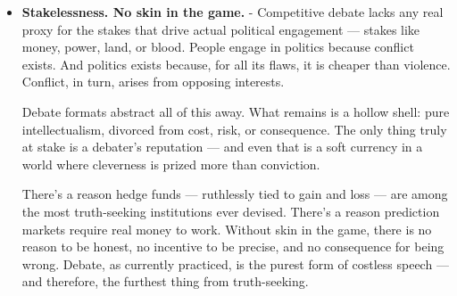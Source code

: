 \begin{itemize}
    Because adjudicators self-replicate through mentorship, feedback, and appointment to “breaking” panels, the ideological DNA of early community leaders becomes canon law. These norms propagate not via formal enforcement but prestige incentives (e.g. who gets to judge finals, give feedback, or train national teams).
    
    BP’s elite adjudicator pool has effectively ossified into a monoculture: university-educated, liberal-globalist, anti-discrimination, pro-minority, suspicious of religion, skeptical of nationalism, technocratic in outlook.

    Furthermore, one must note, unlike Common Law courts where there's an appeal system, there is no such thing in debate tournaments. There is no downside risk that can originate from the debating class. Accountability comes only from higher judges of the organizing team, and oftentimes the limited pool of judges mean core adjudicators are highly disincentivized to do anything lest they run out of manpower.

    As a result, there is no real judgement. There's only performativity.\footnote{
        It is probable that the same mechanism is responsible for the ideological capture of Common Law courts in various Common Law jurisdictions - Britain, Hong Kong, Singapore, and elsewhere. They're all 做大戲. The only exception is America, where court battles are still arguably genuine.

    }




    \item \textbf{Stakelessness. No skin in the game.} - 
    Competitive debate lacks any real proxy for the stakes that drive actual political engagement — stakes like money, power, land, or blood. People engage in politics because conflict exists. And politics exists because, for all its flaws, it is cheaper than violence. Conflict, in turn, arises from opposing interests.

    Debate formats abstract all of this away. What remains is a hollow shell: pure intellectualism, divorced from cost, risk, or consequence. The only thing truly at stake is a debater’s reputation — and even that is a soft currency in a world where cleverness is prized more than conviction.

    There’s a reason hedge funds — ruthlessly tied to gain and loss — are among the most truth-seeking institutions ever devised. There’s a reason prediction markets require real money to work. Without skin in the game, there is no reason to be honest, no incentive to be precise, and no consequence for being wrong. Debate, as currently practiced, is the purest form of costless speech — and therefore, the furthest thing from truth-seeking.


\end{itemize}
